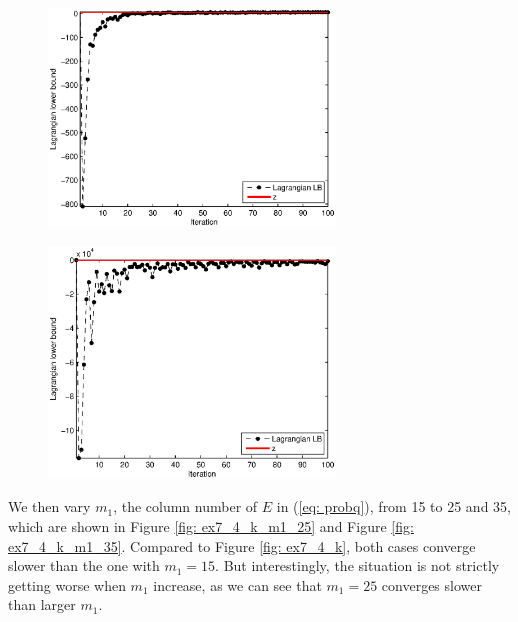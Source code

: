 \begin{figure}[!ht]
\centering
\begin{minipage}{0.49\textwidth}
\includegraphics[width=3.0in]{./p4/ex7_4_k_n100}
\label{fig: ex7_4_k_n100}
\end{minipage}
\begin{minipage}{0.49\textwidth}
\includegraphics[width=3.0in]{./p4/ex7_4_k_n1000}
\label{fig: ex7_4_k_n1000}
\end{minipage}
\end{figure}

We then vary $m_1$, the column number of $E$ in (\ref{eq: probq}), from 15 to 25 and 35, which are shown in Figure \ref{fig: ex7_4_k_m1_25} and Figure \ref{fig: ex7_4_k_m1_35}. Compared to  Figure \ref{fig: ex7_4_k},  both cases converge slower than the one with $m_1=15$. But interestingly, the situation is not strictly getting worse when $m_1$ increase, as we can see that $m_1=25$ converges slower than larger $m_1$.

